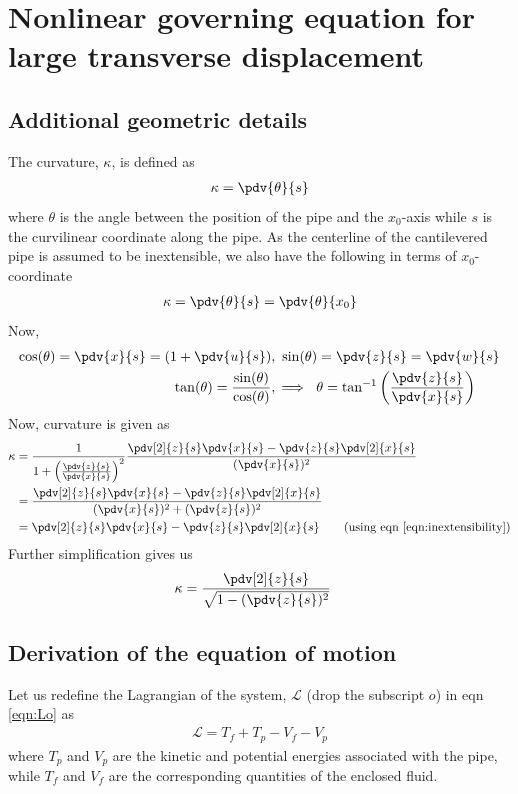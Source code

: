 \chapter{Nonlinear governing equation for large transverse displacement}

\section{Additional geometric details}

The curvature, $\kappa$, is defined as
\begin{align*}
\kappa = \pdv{\theta}{s}
\end{align*}
where $\theta$ is the angle between the position of the pipe and the $x_0$-axis while $s$ is the curvilinear coordinate along the pipe. 
As the centerline of the cantilevered pipe is assumed to be inextensible, we also have the following in terms of $x_0$-coordinate
\begin{align*}
\kappa = \pdv{\theta}{s} = \pdv{\theta}{x_0}
\end{align*}
Now,
\begin{align*}
\cos(\theta) = \pdv{x}{s} = \left(1 + \pdv{u}{s}\right)&,~\sin(\theta) = \pdv{z}{s} =\pdv{w}{s}  \\
\tan(\theta) = \frac{\sin (\theta)}{\cos(\theta)} &, \implies~\theta = \tan^{-1}\left(\frac{\pdv{z}{s}}{\pdv{x}{s}}\right)
\end{align*}
Now, curvature is given as
\begin{align*}
\kappa &= \frac{1}{1 + \left(\frac{\pdv{z}{s}}{\pdv{x}{s}}\right)^2}\frac{\pdv[2]{z}{s}\pdv{x}{s} - \pdv{z}{s}\pdv[2]{x}{s}}{(\pdv{x}{s})^2} \\
&= \frac{\pdv[2]{z}{s}\pdv{x}{s} - \pdv{z}{s}\pdv[2]{x}{s}}{(\pdv{x}{s})^2 + (\pdv{z}{s})^2} \\
&=  \pdv[2]{z}{s}\pdv{x}{s} - \pdv{z}{s}\pdv[2]{x}{s}  \qquad (\text{using eqn \ref{eqn:inextensibility}})
\end{align*}
Further simplification gives us
\begin{align}
\kappa &= \frac{\pdv[2]{z}{s}}{\sqrt{1 - (\pdv{z}{s})^2}} \label{eqn:curvature}
\end{align}

\section{Derivation of the equation of motion}
Let us redefine the Lagrangian of the system, $\mathcal{L}$ (drop the subscript $o$) in eqn \ref{eqn:Lo} as
\begin{align*}
 \mathcal{L} = T_f + T_p - V_f - V_p
\end{align*}
where $T_p$ and $V_p$ are the kinetic and potential energies associated with the pipe, while $T_f$ and $V_f$ are the corresponding quantities of the enclosed fluid.

